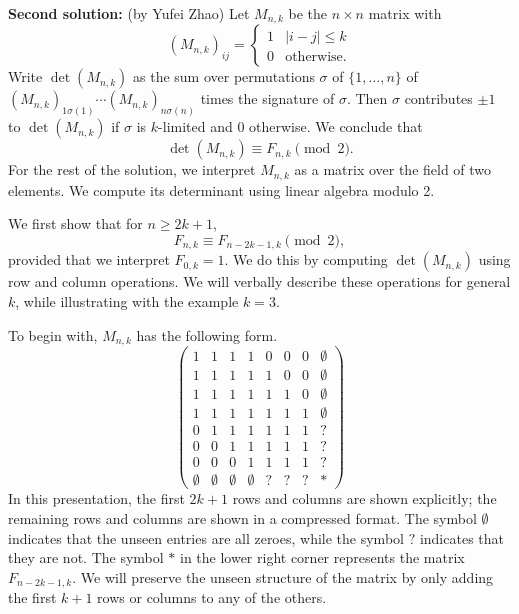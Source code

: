 \documentclass[amssymb,twocolumn,pra,10pt,aps]{revtex4-1}
\begin{document}
\begin{itemize}
\textbf{Second solution:}
(by Yufei Zhao)
Let $M_{n,k}$ be the $n \times n$ matrix with
\[
(M_{n,k})_{ij} = \begin{cases} 1 & |i-j|\leq k \\ 0 & \mbox{otherwise.}
\end{cases}
\]
Write $\det(M_{n,k})$ as the sum over permutations
$\sigma$ of $\{1,\dots,n\}$ of
$(M_{n,k})_{1 \sigma(1)} \cdots (M_{n,k})_{n \sigma(n)}$
times the signature of $\sigma$. Then $\sigma$ contributes $\pm 1$
to $\det (M_{n,k})$ if $\sigma$ is $k$-limited and 0 otherwise.
We conclude that
\[
\det(M_{n,k}) \equiv F_{n,k} \pmod{2}.
\]
For the rest of the solution, we interpret $M_{n,k}$ as a matrix
over the field of two elements. We compute its determinant using
linear algebra modulo 2.

We first show that for $n \geq 2k+1$,
\[
F_{n,k} \equiv F_{n-2k-1,k} \pmod{2},
\]
provided that we interpret $F_{0,k} = 1$. We do this by
computing $\det(M_{n,k})$ using row and column operations.
We will verbally describe these operations for general $k$,
while illustrating with the example $k=3$.

To begin with, $M_{n,k}$ has the following form.
\[
\left(
\begin{array}{ccccccc|c}
1 & 1 & 1 & 1 & 0 & 0 & 0 & \emptyset \\
1 & 1 & 1 & 1 & 1 & 0 & 0 & \emptyset \\
1 & 1 & 1 & 1 & 1 & 1 & 0 & \emptyset \\
1 & 1 & 1 & 1 & 1 & 1 & 1 & \emptyset \\
0 & 1 & 1 & 1 & 1 & 1 & 1 & ? \\
0 & 0 & 1 & 1 & 1 & 1 & 1 & ? \\
0 & 0 & 0 & 1 & 1 & 1 & 1 & ? \\
\hline
\emptyset & \emptyset & \emptyset & \emptyset & ? & ? & ? & *
\end{array}
\right)
\]
In this presentation, the first $2k+1$ rows and columns are shown
explicitly; the remaining rows and columns are shown in a compressed format.
The symbol $\emptyset$ indicates that the unseen entries are all zeroes,
while the symbol $?$ indicates that they are not. The symbol $*$ in the
lower right corner represents the matrix $F_{n-2k-1,k}$.
We will preserve the unseen structure of the matrix by only adding
the first $k+1$ rows or columns to any of the others.


\end{itemize}
\end{document}
